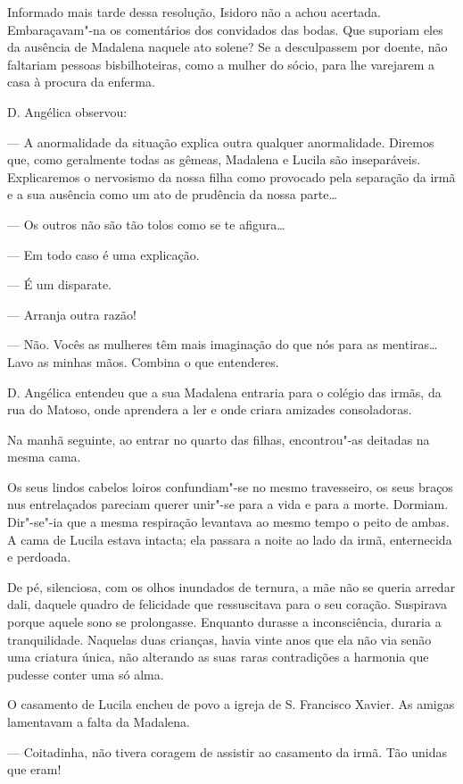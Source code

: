 Informado mais tarde dessa resolução, Isidoro não a achou acertada.
Embaraçavam"-na os comentários dos convidados das bodas. Que suporiam
eles da ausência de Madalena naquele ato solene? Se a desculpassem por
doente, não faltariam pessoas bisbilhoteiras, como a mulher do sócio,
para lhe varejarem a casa à procura da enferma.

D. Angélica observou:

--- A anormalidade da situação explica outra qualquer anormalidade.
Diremos que, como geralmente todas as gêmeas, Madalena e Lucila são
inseparáveis. Explicaremos o nervosismo da nossa filha como provocado
pela separação da irmã e a sua ausência como um ato de prudência da
nossa parte\ldots{}

--- Os outros não são tão tolos como se te afigura\ldots{}

--- Em todo caso é uma explicação.

--- É um disparate.

--- Arranja outra razão!

--- Não. Vocês as mulheres têm mais imaginação do que nós para as
mentiras\ldots{} Lavo as minhas mãos. Combina o que entenderes.

D. Angélica entendeu que a sua Madalena entraria para o colégio das
irmãs, da rua do Matoso, onde aprendera a ler e onde criara amizades
consoladoras.

Na manhã seguinte, ao entrar no quarto das filhas, encontrou"-as deitadas
na mesma cama.

Os seus lindos cabelos loiros confundiam"-se no mesmo travesseiro, os
seus braços nus entrelaçados pareciam querer unir"-se para a vida e para
a morte. Dormiam. Dir"-se"-ia que a mesma respiração levantava ao mesmo
tempo o peito de ambas. A cama de Lucila estava intacta; ela passara a
noite ao lado da irmã, enternecida e perdoada.

De pé, silenciosa, com os olhos inundados de ternura, a mãe não se
queria arredar dali, daquele quadro de felicidade que ressuscitava para
o seu coração. Suspirava porque aquele sono se prolongasse. Enquanto
durasse a inconsciência, duraria a tranquilidade. Naquelas duas
crianças, havia vinte anos que ela não via senão uma criatura única, não
alterando as suas raras contradições a harmonia que pudesse conter uma
só alma.

O casamento de Lucila encheu de povo a igreja de S. Francisco Xavier. As
amigas lamentavam a falta da Madalena.

--- Coitadinha, não tivera coragem de assistir ao casamento da irmã. Tão
unidas que eram!

